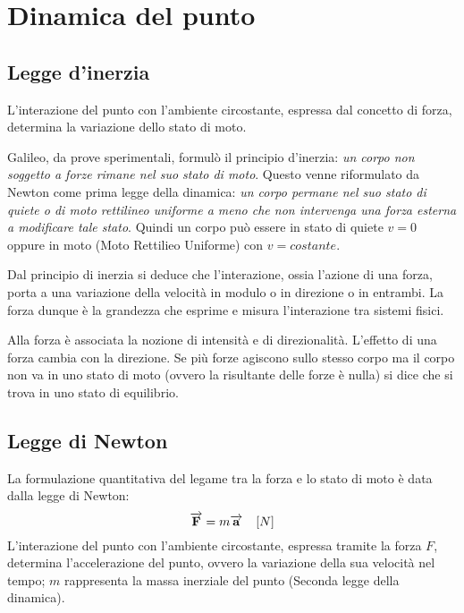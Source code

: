 \documentclass[class=book, crop=false, oneside, 12pt]{standalone}
\begin{document}
\chapter{Dinamica del punto}

\section{Legge d'inerzia}
L'interazione del punto con l'ambiente circostante, espressa dal concetto di forza, determina la variazione dello stato di moto.

Galileo, da prove sperimentali, formulò il principio d'inerzia: \emph{un corpo non soggetto a forze rimane nel suo stato di moto}. 
Questo venne riformulato da Newton come prima legge della dinamica: \emph{un corpo permane nel suo stato di quiete o di moto rettilineo uniforme a meno che non intervenga una forza esterna a modificare tale stato}. 
Quindi un corpo può essere in stato di quiete \(v = 0\) oppure in moto (Moto Rettilieo Uniforme) con \(v = costante\).

Dal principio di inerzia si deduce che l'interazione, ossia l'azione di una forza, porta a una variazione della velocità in modulo o in direzione o in entrambi.
La forza dunque è la grandezza che esprime e misura l'interazione tra sistemi fisici. 

Alla forza è associata la nozione di intensità e di direzionalità.
L'effetto di una forza cambia con la direzione. Se più forze agiscono sullo stesso corpo ma il corpo non va in uno stato di moto (ovvero la risultante delle forze è nulla) si dice che si trova in uno stato di equilibrio.

\section{Legge di Newton }
La formulazione quantitativa del legame tra la forza e lo stato di moto è data dalla legge di Newton:
\begin{equation}
    \overrightarrow{\mathbf{F}} = m \overrightarrow{\mathbf{a}} \ \udm{N}
\end{equation}
L'interazione del punto con l'ambiente circostante, espressa tramite la forza \(F\), determina l'accelerazione del punto, ovvero la variazione della sua velocità nel tempo; \(m\) rappresenta la massa inerziale del punto (Seconda legge della dinamica).
\end{document}
